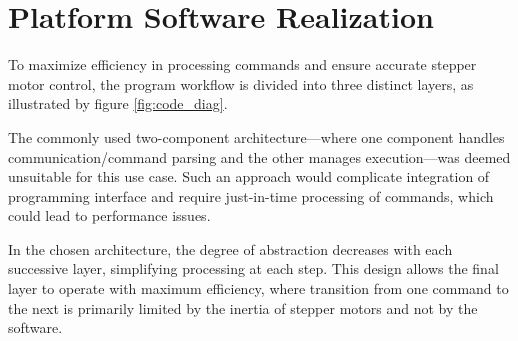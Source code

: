 \section{Platform Software Realization}

To maximize efficiency in processing commands and ensure accurate stepper motor control, the program workflow is divided into three distinct layers, as illustrated by figure \ref{fig:code_diag}.

The commonly used two-component architecture—where one component handles communication/command parsing and the other manages execution—was deemed unsuitable for this use case.
Such an approach would complicate integration of programming interface and require just-in-time processing of commands, which could lead to performance issues.

In the chosen architecture, the degree of abstraction decreases with each successive layer, simplifying processing at each step.
This design allows the final layer to operate with maximum efficiency, where transition from one command to the next is primarily limited by the inertia of stepper motors and not by the software.

